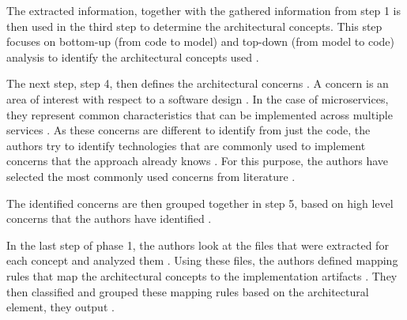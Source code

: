 The extracted information, together with the gathered information from step 1 is then used in the third step to determine the architectural concepts.
This step focuses on bottom-up (from code to model) and top-down (from model to code) analysis to identify the architectural concepts used \cite{Alshuqayran2018MiSAR}.

The next step, step 4, then defines the architectural concerns \cite{Alshuqayran2018MiSAR}.
A concern is an area of interest with respect to a software design \cite{SWEBOK}.
In the case of microservices, they represent common characteristics that can be implemented across multiple services \cite{Alshuqayran2018MiSAR}.
As these concerns are different to identify from just the code, the authors try to identify technologies that are commonly used to implement concerns that the approach already knows \cite{Alshuqayran2018MiSAR}.
For this purpose, the authors have selected the most commonly used concerns from literature \cite{Alshuqayran2018MiSAR}.

The identified concerns are then grouped together in step 5, based on high level concerns that the authors have identified \cite{Alshuqayran2018MiSAR}.

In the last step of phase 1, the authors look at the files that were extracted for each concept and analyzed them \cite{Alshuqayran2018MiSAR}.
Using these files, the authors defined mapping rules that map the architectural concepts to the implementation artifacts \cite{Alshuqayran2018MiSAR}.
They then classified and grouped these mapping rules based on the architectural element, they output \cite{Alshuqayran2018MiSAR}.

